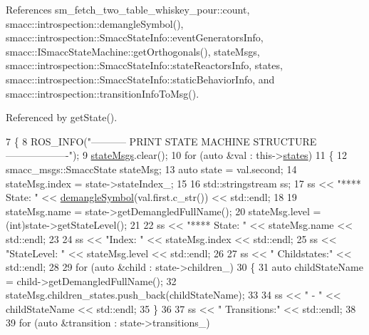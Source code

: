 References sm\+\_\+fetch\+\_\+two\+\_\+table\+\_\+whiskey\+\_\+pour\+::count, smacc\+::introspection\+::demangle\+Symbol(), smacc\+::introspection\+::\+Smacc\+State\+Info\+::event\+Generators\+Info, smacc\+::\+I\+Smacc\+State\+Machine\+::get\+Orthogonals(), state\+Msgs, smacc\+::introspection\+::\+Smacc\+State\+Info\+::state\+Reactors\+Info, states, smacc\+::introspection\+::\+Smacc\+State\+Info\+::static\+Behavior\+Info, and smacc\+::introspection\+::transition\+Info\+To\+Msg().



Referenced by get\+State().


\begin{DoxyCode}
7     \{
8         ROS\_INFO(\textcolor{stringliteral}{"----------- PRINT STATE MACHINE STRUCTURE -------------------"});
9         \hyperlink{classsmacc_1_1introspection_1_1SmaccStateMachineInfo_a48e3ff7bbe2673d23e6942234446ebee}{stateMsgs}.clear();
10         \textcolor{keywordflow}{for} (\textcolor{keyword}{auto} &val : this->\hyperlink{classsmacc_1_1introspection_1_1SmaccStateMachineInfo_aef31d74ad3669f0b0f57fe0e008cd2f8}{states})
11         \{
12             smacc\_msgs::SmaccState stateMsg;
13             \textcolor{keyword}{auto} state = val.second;
14             stateMsg.index = state->stateIndex\_;
15 
16             std::stringstream ss;
17             ss << \textcolor{stringliteral}{"**** State: "} << \hyperlink{namespacesmacc_1_1introspection_a2f495108db3e57604d8d3ff5ef030302}{demangleSymbol}(val.first.c\_str()) << std::endl;
18 
19             stateMsg.name = state->getDemangledFullName();
20             stateMsg.level = (int)state->getStateLevel();
21 
22             ss << \textcolor{stringliteral}{"**** State: "} << stateMsg.name << std::endl;
23 
24             ss << \textcolor{stringliteral}{"Index: "} << stateMsg.index << std::endl;
25             ss << \textcolor{stringliteral}{"StateLevel: "} << stateMsg.level << std::endl;
26 
27             ss << \textcolor{stringliteral}{" Childstates:"} << std::endl;
28 
29             \textcolor{keywordflow}{for} (\textcolor{keyword}{auto} &child : state->children\_)
30             \{
31                 \textcolor{keyword}{auto} childStateName = child->getDemangledFullName();
32                 stateMsg.children\_states.push\_back(childStateName);
33 
34                 ss << \textcolor{stringliteral}{" - "} << childStateName << std::endl;
35             \}
36 
37             ss << \textcolor{stringliteral}{" Transitions:"} << std::endl;
38 
39             \textcolor{keywordflow}{for} (\textcolor{keyword}{auto} &transition : state->transitions\_)

\end{DoxyCode}
